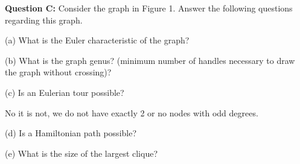 \documentclass[12pt]{article}
\begin{document}
\bigskip
\noindent
\textbf{Question C:} Consider the graph in Figure 1. Answer the following questions regarding this graph.\smallskip

\smallskip
\noindent
(a) What is the Euler characteristic of the graph?\smallskip

\smallskip
\noindent
(b) What is the graph genus? (minimum number of handles necessary to draw the graph without crossing)?\smallskip

\smallskip
\noindent
(c) Is an Eulerian tour possible?\smallskip

No it is not, we do not have exactly 2 or no nodes with odd degrees. \smallskip

\smallskip
\noindent
(d) Is a Hamiltonian path possible?\smallskip

\smallskip
\noindent
(e) What is the size of the largest clique?
\smallskip
\end{document}
